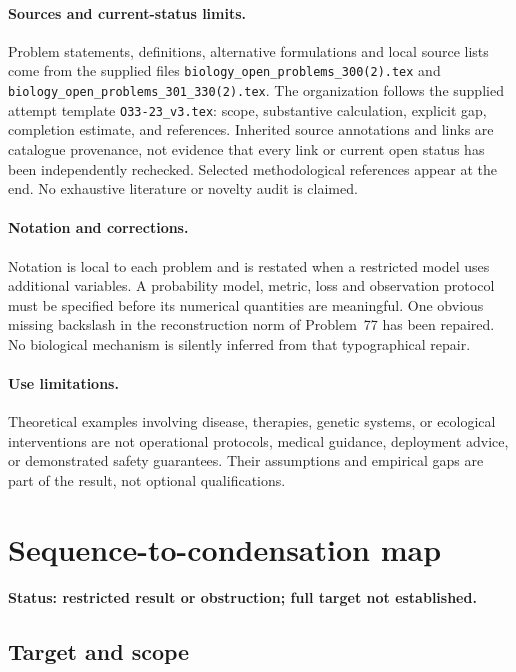 \documentclass[11pt]{article}
\begin{document}
\paragraph{Sources and current-status limits.}
Problem statements, definitions, alternative formulations and local source lists
come from the supplied files
\texttt{biology\_open\_problems\_300(2).tex} and
\texttt{biology\_open\_problems\_301\_330(2).tex}.
The organization follows the supplied attempt template
\texttt{O33-23\_v3.tex}: scope, substantive calculation, explicit gap,
completion estimate, and references. Inherited source annotations and links are
catalogue provenance, not evidence that every link or current open status has
been independently rechecked. Selected methodological references appear at the
end. No exhaustive literature or novelty audit is claimed.

\paragraph{Notation and corrections.}
Notation is local to each problem and is restated when a restricted model uses
additional variables. A probability model, metric, loss and observation protocol
must be specified before its numerical quantities are meaningful. One obvious
missing backslash in the reconstruction norm of Problem~77 has been repaired.
No biological mechanism is silently inferred from that typographical repair.

\paragraph{Use limitations.}
Theoretical examples involving disease, therapies, genetic systems, or ecological
interventions are not operational protocols, medical guidance, deployment advice,
or demonstrated safety guarantees. Their assumptions and empirical gaps are part
of the result, not optional qualifications.


\section*{Sequence-to-condensation map}
\label{prob:005}
\noindent\textbf{Status: restricted result or obstruction; full target not established.}
\subsection{Target and scope}
\end{document}
